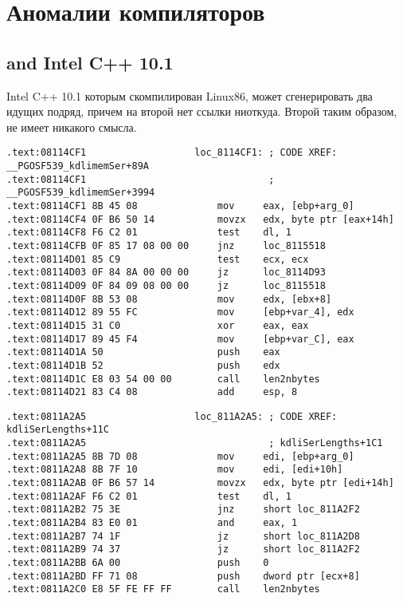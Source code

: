 \section{Аномалии компиляторов}
\label{anomaly:Intel}
\myindex{\CompilerAnomaly}

\subsection{ and Intel C++ 10.1}

\myindex{\oracle}

Intel C++ 10.1 которым скомпилирован  Linux86, может сгенерировать два \JZ идущих подряд, 
причем на второй \JZ нет ссылки ниоткуда. Второй \JZ таким образом, не имеет никакого смысла.

\begin{lstlisting}[caption=kdli.o из libserver11.a,style=customasmx86]
.text:08114CF1                   loc_8114CF1: ; CODE XREF: __PGOSF539_kdlimemSer+89A
.text:08114CF1                                ; __PGOSF539_kdlimemSer+3994
.text:08114CF1 8B 45 08              mov     eax, [ebp+arg_0]
.text:08114CF4 0F B6 50 14           movzx   edx, byte ptr [eax+14h]
.text:08114CF8 F6 C2 01              test    dl, 1
.text:08114CFB 0F 85 17 08 00 00     jnz     loc_8115518
.text:08114D01 85 C9                 test    ecx, ecx
.text:08114D03 0F 84 8A 00 00 00     jz      loc_8114D93
.text:08114D09 0F 84 09 08 00 00     jz      loc_8115518
.text:08114D0F 8B 53 08              mov     edx, [ebx+8]
.text:08114D12 89 55 FC              mov     [ebp+var_4], edx
.text:08114D15 31 C0                 xor     eax, eax
.text:08114D17 89 45 F4              mov     [ebp+var_C], eax
.text:08114D1A 50                    push    eax
.text:08114D1B 52                    push    edx
.text:08114D1C E8 03 54 00 00        call    len2nbytes
.text:08114D21 83 C4 08              add     esp, 8
\end{lstlisting}

\begin{lstlisting}[caption=оттуда же,style=customasmx86]
.text:0811A2A5                   loc_811A2A5: ; CODE XREF: kdliSerLengths+11C
.text:0811A2A5                                ; kdliSerLengths+1C1
.text:0811A2A5 8B 7D 08              mov     edi, [ebp+arg_0]
.text:0811A2A8 8B 7F 10              mov     edi, [edi+10h]
.text:0811A2AB 0F B6 57 14           movzx   edx, byte ptr [edi+14h]
.text:0811A2AF F6 C2 01              test    dl, 1
.text:0811A2B2 75 3E                 jnz     short loc_811A2F2
.text:0811A2B4 83 E0 01              and     eax, 1
.text:0811A2B7 74 1F                 jz      short loc_811A2D8
.text:0811A2B9 74 37                 jz      short loc_811A2F2
.text:0811A2BB 6A 00                 push    0
.text:0811A2BD FF 71 08              push    dword ptr [ecx+8]
.text:0811A2C0 E8 5F FE FF FF        call    len2nbytes
\end{lstlisting}

